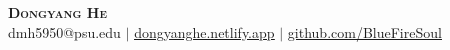 \begin{center}
    \textbf{\Huge \scshape Dongyang He} \\ \vspace{1pt}
    \small dmh5950@psu.edu $|$ \href{https://dongyanghe.netlify.app}{\underline{dongyanghe.netlify.app}} $|$ \href{https://github.com/BlueFireSoul}{\underline{github.com/BlueFireSoul}} 
\end{center}